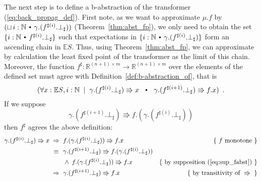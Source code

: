 \documentclass{eptcs}
\theoremstyle{plain}
\theoremstyle{definition}
\newcommand{\Nat}{\ensuremath{\mathbb N}}
\newcommand{\Real}{\ensuremath{\mathbb R}}
\newcommand{\lit}[1]{\ensuremath{\mathit{#1}}}
\newcommand{\totype}{\ensuremath{\ra}}
\newcommand{\ES}{\lit{\mathbb{E}S}}
\newcommand{\ra}{\ensuremath{\rightarrow}}
\newcommand{\dotsep}{\mbox{\raisebox{0.4ex}{\tiny\ensuremath{\:\;\bullet\;\:}}}}
\newcommand{\Eq}{\ensuremath{\mathop{\:\equiv\:}}}
\renewcommand{\And}{\ensuremath{\mathop{\:\wedge\;}}}
\newcommand{\Impl}{\ensuremath{\Rightarrow}}
\newcommand{\elq}{\ensuremath{\Rrightarrow}}
\begin{document}
The next step is to define a \mbox{b-abstraction} of the transformer
(\ref{eq:back_propag_def}). First note, as we want to approximate $\mu.f$ by
$(\sqcup \, i:\Nat \dotsep \gamma.(f^{\sharp (i)}.\bot_\sharp))$
(Theorem~\ref{thm:abst_fp}), we only need to obtain the set $\{i:\Nat \dotsep
f^{\sharp(i)}.\bot_\sharp\}$ such that expectations in $\{i:\Nat \dotsep
\gamma.(f^{\sharp(i)}.\bot_\sharp)\}$ form an ascending chain in $\ES$.
Thus, using Theorem~\ref{thm:abst_fp}, we can approximate by calculation the
least fixed point of the transformer as the limit of this chain. Moreover, the
function $f^\sharp : \Real^{(n+1)\times m} \totype \Real^{(n+1)\times m}$ over
the elements of the defined set must agree with
Definition~\ref{def:b-abstraction_of}, that is 
\[
( \forall x : \ES, i : \Nat \;\;|\;\; 
  \gamma.(f^{\sharp (i)}.\bot_\sharp) \elq x 
  \;\:\dotsep\:\;
  \gamma.(f^{\sharp (i+1)}.\bot_\sharp) \elq f.x
)\enspace.
\]
If we suppose
\begin{equation}\label{eq:sup_fabst}
\gamma.(f^{\sharp (i+1)}.\bot_\sharp) \elq f.(\gamma.(f^{\sharp(i)}.\bot_\sharp))
\end{equation}
then $f^\sharp$ agrees the above definition:
\begin{align*}
\gamma.(f^{\sharp (i)}.\bot_\sharp) \elq x 
  &\;\Impl\; f.(\gamma.(f^{\sharp (i)}.\bot_\sharp)) \elq f.x
    &\mbox{\{ $f$ monotone \}} 
\\&\;\Eq\; \gamma.(f^{\sharp (i+1)}.\bot_\sharp) \elq f.(\gamma.(f^{\sharp(i)}.\bot_\sharp)) 
  \\ &\qquad \And f.(\gamma.(f^{\sharp (i)}.\bot_\sharp)) \elq f.x
    &\mbox{\{ by supposition (\ref{eq:sup_fabst}) \}}
\\&\;\Impl\; \gamma.(f^{\sharp (i+1)}.\bot_\sharp) \elq f.x
    &\mbox{\{ by transitivity of ${}\elq{}$ \}}
\end{align*}
\end{document}

